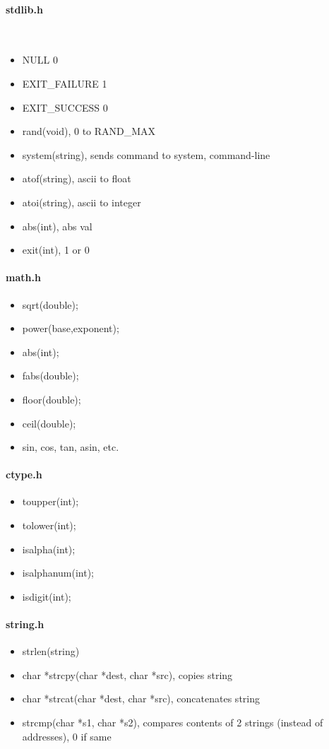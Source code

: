 \documentclass[12 pt]{article}
\begin{document}
\paragraph{stdlib.h}~
\begin{itemize}
	\item NULL 0
	\item EXIT\_FAILURE 1
	\item EXIT\_SUCCESS 0
	\item rand(void), 0 to RAND\_MAX
	\item system(string), sends command to system, command-line
	\item atof(string), ascii to float
	\item atoi(string), ascii to integer
	\item abs(int), abs val
	\item exit(int), 1 or 0
\end{itemize}
\paragraph{math.h}
\begin{itemize}
	\item sqrt(double);
	\item power(base,exponent);
	\item abs(int);
	\item fabs(double);
	\item floor(double);
	\item ceil(double);
	\item sin, cos, tan, asin, etc.
\end{itemize}
\paragraph{ctype.h}
\begin{itemize}
	\item toupper(int);
	\item tolower(int);
	\item isalpha(int);
	\item isalphanum(int);
	\item isdigit(int);
\end{itemize}
\paragraph{string.h}
\begin{itemize}
	\item strlen(string)
	\item char *strcpy(char *dest, char *src), copies string
	\item char *strcat(char *dest, char *src), concatenates string
	\item strcmp(char *s1, char *s2), compares contents of 2 strings (instead of addresses), 0 if same
	\end{itemize}
\end{document}
